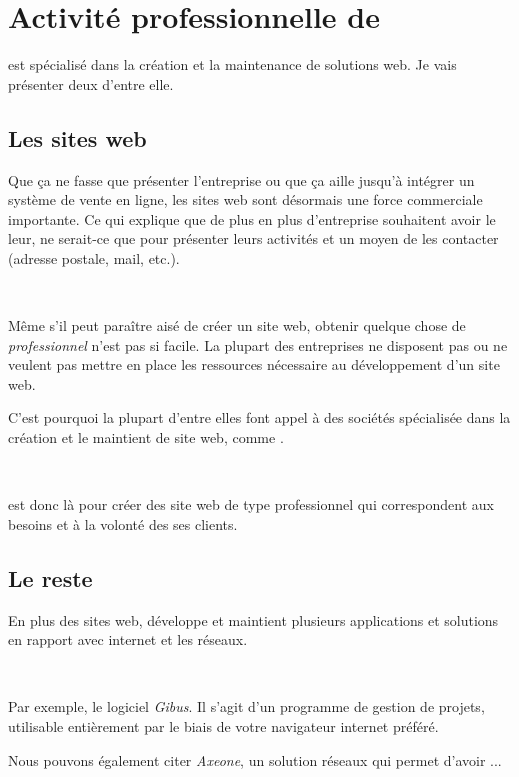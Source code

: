 \chapter{Activité professionnelle de \fidit}
\fidit{} est spécialisé dans la création et la maintenance de solutions web. Je vais présenter deux d'entre elle.

\section{Les sites web}
Que ça ne fasse que présenter l'entreprise ou que ça aille jusqu'à intégrer un système de vente en ligne, les sites web sont désormais une force commerciale importante. Ce qui explique que de plus en plus d'entreprise souhaitent avoir le leur, ne serait-ce que pour présenter leurs activités et un moyen de les contacter (adresse postale, mail, etc.).

~

Même s'il peut paraître aisé de créer un site web, obtenir quelque chose de \emph{professionnel} n'est pas si facile. La plupart des entreprises ne disposent pas ou ne veulent pas mettre en place les ressources nécessaire au développement d'un site web.

C'est pourquoi la plupart d'entre elles font appel à des sociétés spécialisée dans la création et le maintient de site web, comme \fidit.

~

\fidit{} est donc là pour créer des site web de type professionnel qui correspondent aux besoins et à la volonté des ses clients.

\section{Le reste}
En plus des sites web, \fidit{} développe et maintient plusieurs applications et solutions en rapport avec internet et les réseaux.

~

Par exemple, le logiciel \emph{Gibus}. Il s'agit d'un programme de gestion de projets, utilisable entièrement par le biais de votre navigateur internet préféré.

Nous pouvons également citer \emph{Axeone}, un solution réseaux qui permet d'avoir ...
